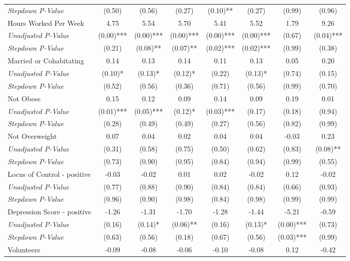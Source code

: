 \begin{tabular}{l c c c c c c c}
\quad \textit{Stepdown P-Value} & (0.50) & (0.56) & (0.27) & (0.10)** & (0.27) & (0.99) & (0.96) \\
Hours Worked Per Week & 4.75 & 5.54 & 5.70 & 5.41 & 5.52 & 1.79 & 9.26 \\
\quad \textit{Unadjusted P-Value} & (0.00)*** & (0.00)*** & (0.00)*** & (0.00)*** & (0.00)*** & (0.67) & (0.04)*** \\
\quad \textit{Stepdown P-Value} & (0.21) & (0.08)** & (0.07)** & (0.02)*** & (0.02)*** & (0.99) & (0.38) \\
Married or Cohabitating & 0.14 & 0.13 & 0.14 & 0.11 & 0.13 & 0.05 & 0.20 \\
\quad \textit{Unadjusted P-Value} & (0.10)* & (0.13)* & (0.12)* & (0.22) & (0.13)* & (0.74) & (0.15) \\
\quad \textit{Stepdown P-Value} & (0.52) & (0.56) & (0.36) & (0.71) & (0.56) & (0.99) & (0.70) \\
Not Obese & 0.15 & 0.12 & 0.09 & 0.14 & 0.09 & 0.19 & 0.01 \\
\quad \textit{Unadjusted P-Value} & (0.01)*** & (0.05)*** & (0.12)* & (0.03)*** & (0.17) & (0.18) & (0.94) \\
\quad \textit{Stepdown P-Value} & (0.28) & (0.49) & (0.49) & (0.27) & (0.56) & (0.82) & (0.99) \\
Not Overweight & 0.07 & 0.04 & 0.02 & 0.04 & 0.04 & -0.03 & 0.23 \\
\quad \textit{Unadjusted P-Value} & (0.31) & (0.58) & (0.75) & (0.50) & (0.62) & (0.83) & (0.08)** \\
\quad \textit{Stepdown P-Value} & (0.73) & (0.90) & (0.95) & (0.84) & (0.94) & (0.99) & (0.55) \\
Locus of Control - positive & -0.03 & -0.02 & 0.01 & 0.02 & -0.02 & 0.12 & -0.02 \\
\quad \textit{Unadjusted P-Value} & (0.77) & (0.88) & (0.90) & (0.84) & (0.84) & (0.66) & (0.93) \\
\quad \textit{Stepdown P-Value} & (0.96) & (0.90) & (0.98) & (0.84) & (0.98) & (0.99) & (0.99) \\
Depression Score - positive & -1.26 & -1.31 & -1.70 & -1.28 & -1.44 & -5.21 & -0.59 \\
\quad \textit{Unadjusted P-Value} & (0.16) & (0.14)* & (0.06)** & (0.16) & (0.13)* & (0.00)*** & (0.73) \\
\quad \textit{Stepdown P-Value} & (0.63) & (0.56) & (0.18) & (0.67) & (0.56) & (0.03)*** & (0.99) \\
Volunteers & -0.09 & -0.08 & -0.06 & -0.10 & -0.08 & 0.12 & -0.42 \\

\end{tabular}
